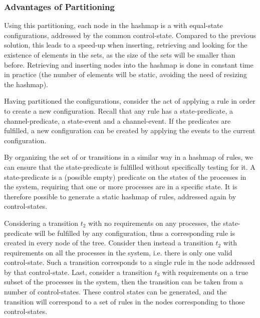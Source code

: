 

\subsubsection{Advantages of Partitioning}
Using this partitioning, each node in the hashmap is a  with equal-state configurations, addressed by the common control-state. Compared to the previous solution, this leads to a speed-up when inserting, retrieving and looking for the existence of elements in the sets, as the size of the sets will be smaller than before. Retrieving and inserting nodes into the hashmap is done in constant time in practice (the number of elements will be static, avoiding the need of resizing the hashmap).

Having partitioned the configurations, consider the act of applying a rule in order to create a new configuration. Recall that any rule has a state-predicate, a channel-predicate, a state-event and a channel-event. If the predicates are fulfilled, a new configuration can be created by applying the events to the current configuration.

By organizing the set of  or transitions in a similar way in a hashmap of rules, we can ensure that the state-predicate is fulfilled without specifically testing for it. A state-predicate is a (possible empty) predicate on the states of the processes in the system, requiring that one or more processes are in a specific state. It is therefore possible to generate a static hashmap of rules, addressed again by control-states.

Considering a transition $t_2$ with no requirements on any processes, the state-predicate will be fulfilled by any configuration, thus a corresponding rule is created in every node of the tree. Consider then instead a transition $t_2$ with requirements on all the processes in the system, i.e. there is only one valid control-state. Such a transition corresponds to a single rule in the node addressed by that control-state. Last, consider a transition $t_3$ with requirements on a true subset of the processes in the system, then the transition can be taken from a number of control-states. These control states can be generated, and the transition will correspond to a set of rules in the nodes corresponding to those control-states.

